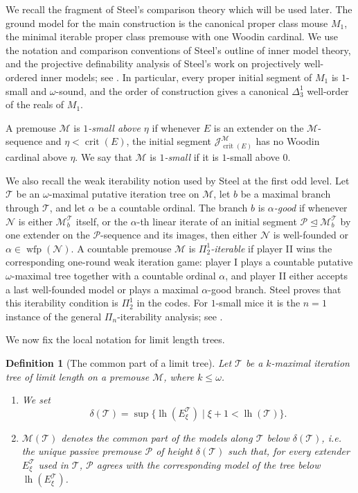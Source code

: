 \documentclass[a4paper,11pt]{article}
\newtheorem{definition}[theorem]{Definition}
\begin{document}
We recall the fragment of Steel's comparison theory which will be used later.  The ground model for the main construction is the canonical proper class mouse $M_1$, the minimal iterable proper class premouse with one Woodin cardinal.  We use the notation and comparison conventions of Steel's outline of inner model theory, and the projective definability analysis of Steel's work on projectively well-ordered inner models; see \cite{Steel3,Steel2}.  In particular, every proper initial segment of $M_1$ is $1$-small and $\omega$-sound, and the order of construction gives a canonical $\Delta^1_3$ well-order of the reals of $M_1$.

A premouse $\mathcal M$ is \emph{$1$-small above $\eta$} if whenever $E$ is an extender on the $\mathcal M$-sequence and $\eta<\operatorname{crit}(E)$, the initial segment $\mathcal J^{\mathcal M}_{\operatorname{crit}(E)}$ has no Woodin cardinal above $\eta$.  We say that $\mathcal M$ is \emph{$1$-small} if it is $1$-small above $0$.

We also recall the weak iterability notion used by Steel at the first odd level.  Let $\mathcal T$ be an $\omega$-maximal putative iteration tree on $\mathcal M$, let $b$ be a maximal branch through $\mathcal T$, and let $\alpha$ be a countable ordinal.  The branch $b$ is \emph{$\alpha$-good} if whenever $\mathcal N$ is either $\mathcal M_b^{\mathcal T}$ itself, or the $\alpha$-th linear iterate of an initial segment $\mathcal P\trianglelefteq \mathcal M_b^{\mathcal T}$ by one extender on the $\mathcal P$-sequence and its images, then either $\mathcal N$ is well-founded or $\alpha\in\operatorname{wfp}(\mathcal N)$.  A countable premouse $\mathcal M$ is \emph{$\Pi^1_2$-iterable} if player II wins the corresponding one-round weak iteration game: player I plays a countable putative $\omega$-maximal tree together with a countable ordinal $\alpha$, and player II either accepts a last well-founded model or plays a maximal $\alpha$-good branch.  Steel proves that this iterability condition is $\Pi^1_2$ in the codes.  For $1$-small mice it is the $n=1$ instance of the general $\Pi_n$-iterability analysis; see \cite[Lemma~1.7]{Steel2}.

We now fix the local notation for limit length trees.

\begin{definition}[The common part of a limit tree]\label{def:delta-common-part}
Let $\mathcal T$ be a $k$-maximal iteration tree of limit length on a premouse $\mathcal M$, where $k\leq\omega$.
\begin{enumerate}
   \item We set
   \[
      \delta(\mathcal T)=
      \sup\{\operatorname{lh}(E_\xi^{\mathcal T})\mid
             \xi+1<\operatorname{lh}(\mathcal T)\}.
   \]
   \item $\mathcal M(\mathcal T)$ denotes the common part of the models along $\mathcal T$ below $\delta(\mathcal T)$, i.e. the unique passive premouse $\mathcal P$ of height $\delta(\mathcal T)$ such that, for every extender $E_\xi^{\mathcal T}$ used in $\mathcal T$, $\mathcal P$ agrees with the corresponding model of the tree below $\operatorname{lh}(E_\xi^{\mathcal T})$.
\end{enumerate}
\end{definition}
\end{document}
